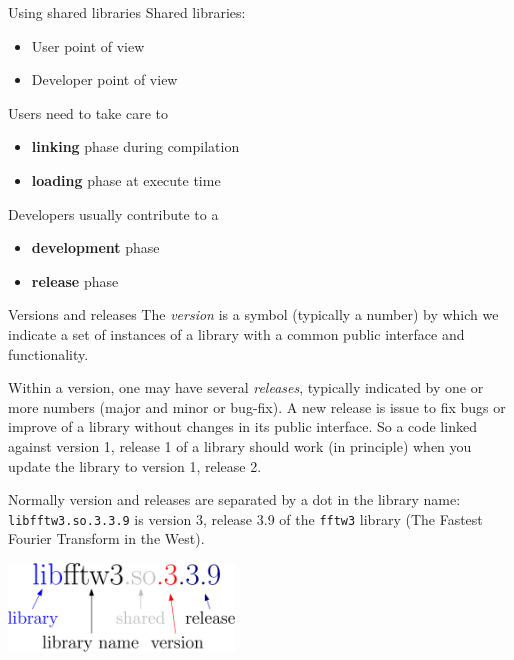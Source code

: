 \documentclass[10pt,aspectratio=169]{beamer}
\begin{document}
\begin{frame}{Using shared libraries}
   Shared libraries:
   \begin{itemize}
       \item User point of view
       \item Developer point of view
   \end{itemize}

  \medskip
   Users need to take care to 
   \begin{itemize}
       \item \textbf{linking} phase during compilation
       \item \textbf{loading} phase at execute time
   \end{itemize}

  \medskip
   Developers usually contribute to a
   \begin{itemize}
       \item \textbf{development} phase
       \item \textbf{release} phase
   \end{itemize}

\end{frame}


\begin{frame}{Versions and releases} 
  The \emph{version} is a symbol
  (typically a number) by which we indicate a set of instances of a
  library with a common public interface and functionality.
  \smallskip

    Within a version, one may have several \textit{releases}, typically indicated
  by one or more numbers (major and minor or bug-fix). A new release is 
  issue to fix bugs  or improve of a library without
  changes in its public interface. So a code linked against version 1,
  release 1 of a library should work (in principle) when you update
  the library to version 1, release 2.
  \smallskip

  Normally version and releases are separated by a dot in the library name:
  \texttt{libfftw3.so.3.3.9} is version 3, release 3.9 of the
  \texttt{fftw3} library (The Fastest Fourier Transform in the West).

  \begin{center}
      \includegraphics[width=0.45\textwidth]{ipe/libExplained.pdf}
  \end{center}

\end{frame}
\end{document}
